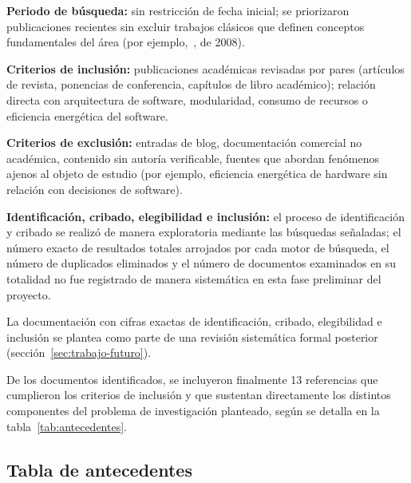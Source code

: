 \textbf{Periodo de búsqueda:} sin restricción de fecha inicial; se priorizaron publicaciones recientes sin excluir trabajos clásicos que definen conceptos fundamentales del área (por ejemplo,~\cite{seo2008framework}, de 2008).

\textbf{Criterios de inclusión:} publicaciones académicas revisadas por pares (artículos de revista, ponencias de conferencia, capítulos de libro académico); relación directa con arquitectura de software, modularidad, consumo de recursos o eficiencia energética del software.

\textbf{Criterios de exclusión:} entradas de blog, documentación comercial no académica, contenido sin autoría verificable, fuentes que abordan fenómenos ajenos al objeto de estudio (por ejemplo, eficiencia energética de hardware sin relación con decisiones de software).

\textbf{Identificación, cribado, elegibilidad e inclusión:} el proceso de identificación y cribado se realizó de manera exploratoria mediante las búsquedas señaladas; el número exacto de resultados totales arrojados por cada motor de búsqueda, el número de duplicados eliminados y el número de documentos examinados en su totalidad no fue registrado de manera sistemática en esta fase preliminar del proyecto.

La documentación con cifras exactas de identificación, cribado, elegibilidad e inclusión se plantea como parte de una revisión sistemática formal posterior (sección~\ref{sec:trabajo-futuro}).

De los documentos identificados, se incluyeron finalmente 13 referencias que cumplieron los criterios de inclusión y que sustentan directamente los distintos componentes del problema de investigación planteado, según se detalla en la tabla~\ref{tab:antecedentes}.

\subsection{Tabla de antecedentes}

